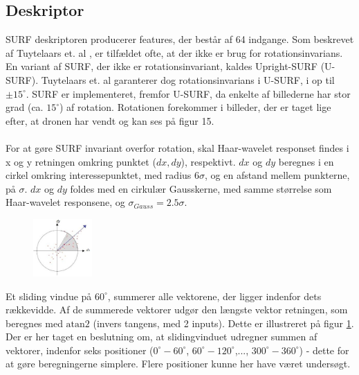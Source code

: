 \subsection{Deskriptor}
SURF deskriptoren producerer features, der består af 64 indgange. Som beskrevet af Tuytelaars et. al \cite{SURF}, er tilfældet ofte, at der ikke er brug for rotationsinvarians. En variant af SURF, der ikke er rotationsinvariant, kaldes Upright-SURF (U-SURF). Tuytelaars et. al garanterer dog rotationsinvarians i U-SURF, i op til $\pm 15^{\circ}$. SURF er implementeret, fremfor U-SURF, da enkelte af billederne har stor grad (ca. $15^{\circ}$) af rotation. Rotationen forekommer i billeder, der er taget lige efter, at dronen har vendt og kan ses på figur 15.
\\
\\
For at gøre SURF invariant overfor rotation, skal Haar-wavelet responset findes i x og y retningen omkring punktet ($dx, dy$), respektivt. $dx$ og $dy$ beregnes i en cirkel omkring interessepunktet, med radius $6\sigma$, og en afstand mellem punkterne, på $\sigma$. $dx$ og $dy$ foldes med en cirkulær Gausskerne, med samme størrelse som Haar-wavelet responsene, og $\sigma_{Gauss} = 2.5\sigma$.
\begin{figure}[H]
    \centering
    \includegraphics[width=0.2\textwidth]{fig/surforientation.jpg}
     \vspace{-1em}
    \begin{center}    
       \caption{\textcolor{gray}{\footnotesize \textit{ }}}
    \label{fig:surforientation}
     \end{center}
     \vspace{-2.5em}
  \end{figure} \noindent
Et sliding vindue på $60^{\circ}$, summerer alle vektorene, der ligger indenfor dets rækkevidde. Af de summerede vektorer udgør den længste vektor retningen, som beregnes med $\text{atan2}$ (invers tangens, med 2 inputs). Dette er illustreret på figur \ref{fig:surforientation}. Der er her taget en beslutning om, at slidingvinduet udregner summen af vektorer, indenfor seks positioner ($0^{\circ}-60^{\circ}$, $60^{\circ}-120^{\circ}$,..., $300^{\circ}-360^{\circ}$) - dette for at gøre beregningerne simplere. Flere positioner kunne her have været undersøgt.
